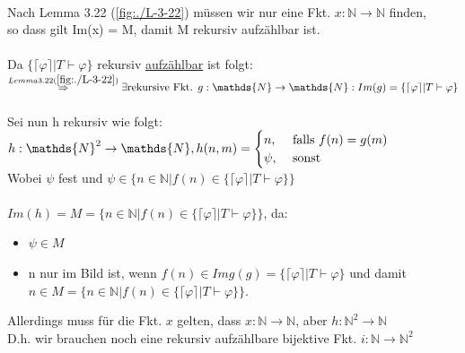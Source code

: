 \documentclass[a4paper]{scrartcl}%
\begin{document}
\begin{itemize}
\begin{itemize}
                    \\Nach Lemma 3.22 (\ref{fig:./L-3-22}) müssen wir nur eine Fkt. $x: \mathds{N} \rightarrow \mathds{N}$ finden,\\
                    so dass gilt Im(x) = M, damit M rekursiv aufzählbar ist.\\
                    \\Da $\{\lceil \varphi \rceil | T \vdash \varphi\}$ rekursiv \underline{aufzählbar} ist folgt:\\
                    $\overset{Lemma 3.22 (\ref{fig:./L-3-22})}{\Rightarrow} \exists \text{rekursive Fkt. } g: \mathds{N} \rightarrow \mathds{N}:
                    Im(g) = \{\lceil \varphi \rceil | T \vdash \varphi\}$\\
                    \\Sei nun h rekursiv wie folgt:\\
                    $h: \mathds{N}^2 \rightarrow \mathds{N},\\
                    h(n,m) = \begin{cases}
                        n, &\text{ falls }f(n) = g(m)\\
                        \psi, &\text{ sonst}\\
                    \end{cases}$\\
                    Wobei $\psi$ fest und $\psi \in \{n \in \mathds{N} | f(n) \in \{\lceil \varphi \rceil | T \vdash \varphi\}\}$\\
                    \\$Im(h) = M = \{n \in \mathds{N} | f(n) \in \{\lceil \varphi \rceil | T \vdash \varphi\}\}$, da:\\
                    \begin{itemize}
                        \item $\psi \in M$\\
                        \item n nur im Bild ist, wenn $f(n) \in Img(g) = \{\lceil \varphi \rceil | T \vdash \varphi\}$ und damit
                    $n \in M = \{n \in \mathds{N} | f(n) \in \{\lceil \varphi \rceil | T \vdash \varphi\}\}$.\\
                    \end{itemize}
                    Allerdings muss für die Fkt. $x$ gelten, dass $x: \mathds{N} \rightarrow \mathds{N}$, aber $h: \mathds{N}^2 \rightarrow \mathds{N}$\\
                    D.h. wir brauchen noch eine rekursiv aufzählbare bijektive Fkt. $i: \mathds{N} \rightarrow \mathds{N}^2$\\

\end{itemize}
\end{itemize}
\end{document}
